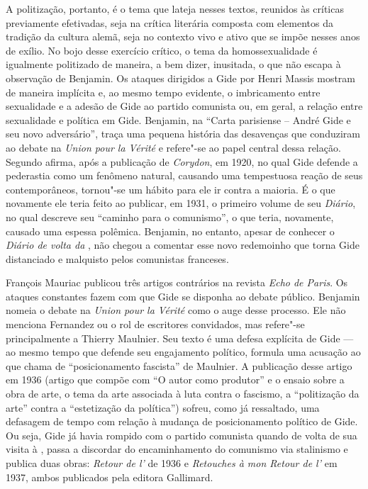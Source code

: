 A politização, portanto, é o tema que lateja nesses textos, reunidos às
críticas previamente efetivadas, seja na crítica literária composta com
elementos da tradição da cultura alemã, seja no contexto vivo e ativo
que se impõe nesses anos de exílio. No bojo desse exercício crítico, o
tema da homossexualidade é igualmente politizado de maneira, a bem
dizer, inusitada, o que não escapa à observação de Benjamin. Os ataques
dirigidos a Gide por Henri Massis mostram de maneira implícita e, ao
mesmo tempo evidente, o imbricamento entre sexualidade e a adesão de
Gide ao partido comunista ou, em geral, a relação entre sexualidade e
política em Gide. Benjamin, na ``Carta parisiense  -- André Gide e seu
novo adversário'', traça uma pequena história das desavenças que
conduziram ao debate na \emph{Union pour la Vérité} e refere"-se ao papel
central dessa relação. Segundo afirma, após a publicação de
\emph{Corydon}, em 1920, no qual Gide defende a pederastia como um
fenômeno natural, causando uma tempestuosa reação de seus
contemporâneos, tornou"-se um hábito para ele ir contra a maioria. É o
que novamente ele teria feito ao publicar, em 1931, o primeiro volume de
seu \emph{Diário}, no qual descreve seu ``caminho para o comunismo'', o
que teria, novamente, causado uma espessa polêmica. Benjamin, no
entanto, apesar de conhecer o \emph{Diário de volta da} , não
chegou a comentar esse novo redemoinho que torna Gide distanciado e
malquisto pelos comunistas franceses.

François Mauriac publicou três artigos contrários na revista \emph{Echo de
Paris}. Os ataques constantes fazem com que Gide se disponha ao debate
público. Benjamin nomeia o debate na \emph{Union pour la Vérité} como o
auge desse processo. Ele não menciona Fernandez ou o rol de escritores
convidados, mas refere"-se principalmente a Thierry Maulnier. Seu texto é
uma defesa explícita de Gide --- ao mesmo tempo que defende seu
engajamento político, formula uma acusação ao que chama de
``posicionamento fascista'' de Maulnier. A publicação desse artigo em
1936 (artigo que compõe com ``O autor como produtor'' e o ensaio sobre a
obra de arte, o tema da arte associada à luta contra o fascismo, a
``politização da arte'' contra a ``estetização da política'') sofreu,
como já ressaltado, uma defasagem de tempo com relação à mudança de
posicionamento político de Gide. Ou seja, Gide já havia rompido com o
partido comunista quando de volta de sua visita à , passa a
discordar do encaminhamento do comunismo via stalinismo e publica duas
obras: \emph{Retour de l'} de 1936 e \emph{Retouches à mon
Retour de l'} em 1937, ambos publicados pela editora Gallimard.

